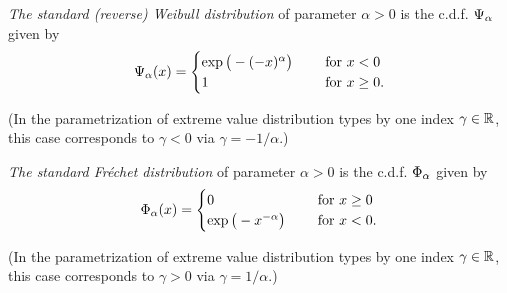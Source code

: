 \begin{definition}
  \label{def:std-Weibull-cdf}
  \emph{The standard (reverse) Weibull distribution} of parameter
  $\alpha > 0$ is the c.d.f. $\Psi_{\alpha}$ given by
  \begin{align*}
  \Psi_{\alpha} (x) = \begin{cases}
      \exp \big( - (-x)^\alpha \big) \quad & \text{ for } x < 0 \\
      1 \quad & \text{ for } x \ge 0 .
    \end{cases}
  \end{align*}

  (In the parametrization of extreme value distribution types by one
  index $\gamma \in \mathbb{R}$, this case corresponds to $\gamma < 0$
  via $\gamma = -1/\alpha$.)
\end{definition}

\begin{definition}
  \label{def:std-Frechet-cdf}
  \emph{The standard Fr\'echet distribution} of parameter $\alpha > 0$
  is the c.d.f. $\Phi_{\alpha}$ given by
  \begin{align*}
  \Phi_{\alpha} (x) = \begin{cases}
    0 \quad & \text{ for } x \ge 0 \\
    \exp \big( - x^{-\alpha} \big) \quad & \text{ for } x < 0 .
    \end{cases}
  \end{align*}

  (In the parametrization of extreme value distribution types by one
  index $\gamma \in \mathbb{R}$, this case corresponds to $\gamma > 0$
  via $\gamma = 1/\alpha$.)
\end{definition}

